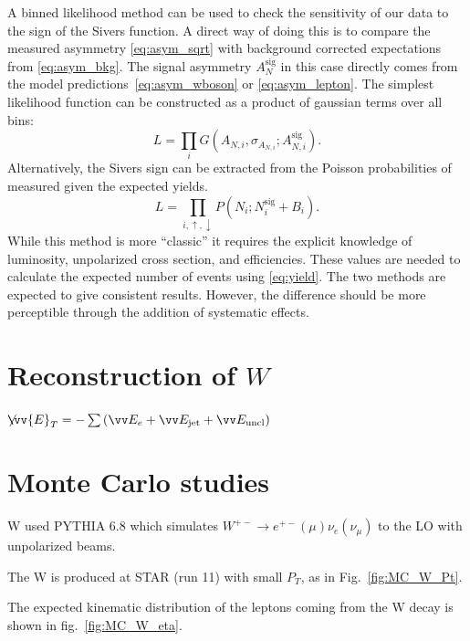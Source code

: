 \documentclass[12pt]{article}
\newcommand{\missET}{\not\!\!\vv{E}_T}
\begin{document}
A binned likelihood method can be used to check the sensitivity of our data to
the sign of the Sivers function. A direct way of doing this is to compare the
measured asymmetry \eqref{eq:asym_sqrt} with background corrected expectations
from \eqref{eq:asym_bkg}. The signal asymmetry $A^\text{sig}_N$ in this case
directly comes from the model predictions~\eqref{eq:asym_wboson} or
\eqref{eq:asym_lepton}. The simplest likelihood function can be constructed as a
product of gaussian terms over all bins:
%
\begin{equation}
L = \prod\limits_i G(A_{N,i}, \sigma_{A_{N,i}}; A^\text{sig}_{N,i}).
\end{equation}
%
Alternatively, the Sivers sign can be extracted from the Poisson probabilities
of measured given the expected yields.
%
\begin{equation}
L = \prod\limits_{i,\uparrow,\downarrow} P(N_i; N^\text{sig}_{i} + B_i).
\end{equation}
%
While this method is more ``classic'' it requires the explicit knowledge of
luminosity, unpolarized cross section, and efficiencies. These values are needed
to calculate the expected number of events using \eqref{eq:yield}. The two
methods are expected to give consistent results. However, the difference should
be more perceptible through the addition of systematic effects.



\section{Reconstruction of $W$}

$\missET = - \sum \left( \vv E_e + \vv E_\text{jet} +  \vv E_\text{uncl} \right)$


\section{Monte Carlo studies}

W used PYTHIA 6.8 which simulates $W^{+-} \rightarrow e^{+-}(\mu)\nu_e(\nu_{\mu})$ to the LO with unpolarized beams. 

The W is produced at STAR (run 11) with small $P_T$, as in Fig.~\ref{fig:MC_W_Pt}.

The expected kinematic distribution of the leptons coming from the W decay is shown in fig.~\ref{fig:MC_W_eta}.
\end{document}
